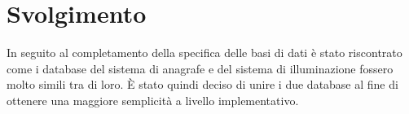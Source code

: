 \section{Svolgimento}

In seguito al completamento della specifica delle basi di dati è stato riscontrato come i database del sistema di anagrafe e del sistema di illuminazione fossero molto simili tra di loro. È stato quindi deciso di unire i due database al fine di ottenere una maggiore semplicità a livello implementativo.